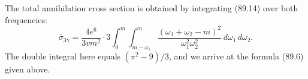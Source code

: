 

The total annihilation cross section is obtained by integrating (89.14) over both frequencies:
\[
\bar{\sigma}_{3\gamma} = \frac{4e^6}{3vm^2} \cdot 3 \int_0^m\!\int_{m-\omega_1}^m \frac{(\omega_1+\omega_2-m)^2}{\omega_1^2\omega_2^2}\,d\omega_1\,d\omega_2.
\]
The double integral here equals $(\pi^2 - 9)/3$, and we arrive at the formula (89.6) given above.
